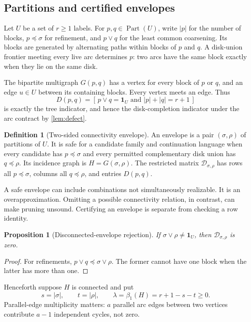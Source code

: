 \documentclass[11pt,a4paper]{article}
\newtheorem{proposition}[theorem]{Proposition}
\theoremstyle{definition}
\newtheorem{definition}[theorem]{Definition}
\theoremstyle{remark}
\newcommand{\Part}{\operatorname{Part}}
\newcommand{\one}{\mathbf 1}
\newcommand{\ind}[1]{[\,#1\,]}
\begin{document}
\subsection{Partitions and certified envelopes}
Let $U$ be a set of $r\ge1$ labels. For $p,q\in\Part(U)$, write $|p|$ for the number
of blocks, $p\preceq\sigma$ for refinement, and $p\vee q$ for the least common
coarsening. Its blocks are generated by alternating paths within blocks of $p$ and $q$.
A disk-union frontier meeting every live arc determines $p$: two arcs have the same
block exactly when they lie on the same disk.

The bipartite multigraph $G(p,q)$ has a vertex for every block of $p$ or $q$, and an
edge $u\in U$ between its containing blocks. Every vertex meets an edge. Thus
\begin{equation}
 D(p,q)=\ind{p\vee q=\one_U\text{ and }|p|+|q|=r+1}
 \label{eq:disk}
\end{equation}
is exactly the tree indicator, and hence the disk-completion indicator under the arc
contract by \cref{lem:defect}.

\begin{definition}[Two-sided connectivity envelope]\label{def:envelope}
An envelope is a pair $(\sigma,\rho)$ of partitions of $U$. It is safe for a candidate
family and continuation language when every candidate has $p\preceq\sigma$ and every
permitted complementary disk union has $q\preceq\rho$. Its incidence graph is
$H=G(\sigma,\rho)$. The restricted matrix $\mathcal D_{\sigma,\rho}$ has rows all
$p\preceq\sigma$, columns all $q\preceq\rho$, and entries $D(p,q)$.
\end{definition}

A safe envelope can include combinations not simultaneously realizable. It is an
overapproximation. Omitting a possible connectivity relation, in contrast, can make
pruning unsound. Certifying an envelope is separate from checking a row identity.

\begin{proposition}[Disconnected-envelope rejection]\label{prop:disconnected}
If $\sigma\vee\rho\ne\one_U$, then $\mathcal D_{\sigma,\rho}$ is zero.
\end{proposition}
\begin{proof}
For refinements, $p\vee q\preceq\sigma\vee\rho$. The former cannot have one block
when the latter has more than one.
\end{proof}
Henceforth suppose $H$ is connected and put
\begin{equation}
 s=|\sigma|,\qquad t=|\rho|,\qquad
 \lambda=\beta_1(H)=r+1-s-t\ge0.
 \label{eq:lambda}
\end{equation}
Parallel-edge multiplicity matters: $a$ parallel arc edges between two vertices contribute
$a-1$ independent cycles, not zero.
\end{document}
